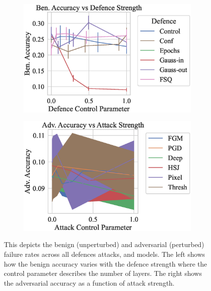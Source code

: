 \begin{figure}
    \centering
    \begin{subfigure}[]{0.45\textwidth}
        \centering
        \includegraphics[width=\textwidth]{cifar_def_param_vs_accuracy.eps}
    \end{subfigure}
    \begin{subfigure}[]{0.45\textwidth}
        \centering
        \includegraphics[width=\textwidth]{cifar_atk_param_vs_accuracy.eps}
    \end{subfigure}
    \caption{This depicts the benign (unperturbed) and adversarial (perturbed) failure rates across all defences attacks, and models. The left shows how the benign accuracy varies with the defence strength where the control parameter describes the number of layers. The right shows the adversarial accuracy as a function of attack strength.}
    \label{fig:cifar_strength}
\end{figure}

